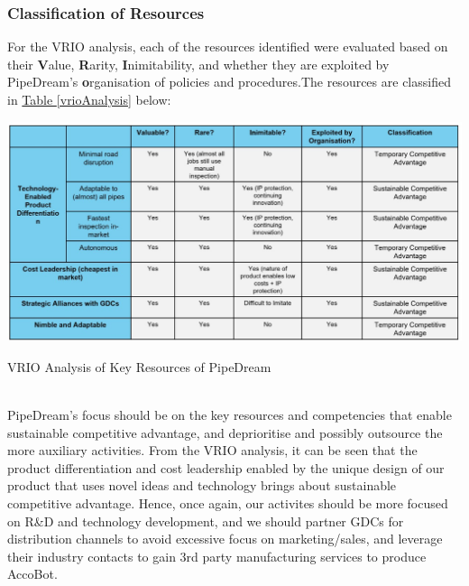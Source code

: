 \documentclass[11pt]{article}		%
\newcommand{\tableref}[1]{\hyperref[#1]{Table \ref*{#1}}}     %
\begin{document}
	
	\subsubsection{Classification of Resources}
	
    For the VRIO analysis, each of the resources identified were evaluated based on their \textbf{V}alue, \textbf{R}arity, \textbf{I}nimitability, and whether they are exploited by PipeDream's \textbf{o}rganisation of policies and procedures.The resources are classified in \tableref{vrioAnalysis} below: 
                \begin{table}[h]
					\centering
					\includegraphics[width=\textwidth]{VRIO.jpg}
					\caption{VRIO Analysis of Key Resources of PipeDream}
					\label{vrioAnalysis}
			    \end{table}
	\\ 
	\hspace*{3ex} PipeDream's focus should be on the key resources and competencies that enable sustainable competitive advantage, and deprioritise and possibly outsource the more auxiliary activities. From the VRIO analysis, it can be seen that the product differentiation and cost leadership enabled by the unique design of our product that uses novel ideas and technology brings about sustainable competitive advantage. Hence, once again, our activites should be more focused on R\&D and technology development, and we should partner GDCs for distribution channels to avoid excessive focus on marketing/sales, and leverage their industry contacts to gain 3rd party manufacturing services to produce AccoBot. 
	
\end{document}
